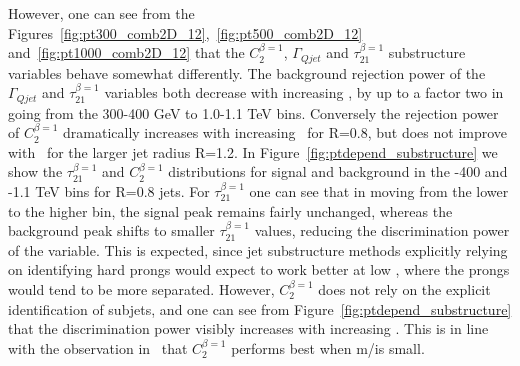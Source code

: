 However, one can see from the Figures~\ref{fig:pt300_comb2D_12},~\ref{fig:pt500_comb2D_12}
and~\ref{fig:pt1000_comb2D_12} that the $C_2^{\beta=1}$, $\Gamma_{Qjet}$ and
$\tau_{21}^{\beta=1}$ substructure variables behave somewhat
differently. The background rejection power of the $\Gamma_{Qjet}$ and
$\tau_{21}^{\beta=1}$ variables both decrease with increasing \pt, by
up to a factor two in going from the 300-400 GeV to
1.0-1.1 TeV bins. Conversely the rejection power of $C_2^{\beta=1}$
dramatically increases with increasing \pt~for R=0.8, but does not
improve with \pt~for the larger jet radius R=1.2. In Figure~\ref{fig:ptdepend_substructure} we show the
$\tau_{21}^{\beta=1}$ and $C_2^{\beta=1}$ distributions for signal and background in the -400 and -1.1 TeV bins for R=0.8 jets. For
$\tau_{21}^{\beta=1}$ one can see that in moving from the lower to the
higher \pt bin, the signal peak remains fairly unchanged, whereas the
background peak shifts to smaller $\tau_{21}^{\beta=1}$ values,
reducing the discrimination power of the variable. This is expected,
since jet substructure methods explicitly relying on identifying hard
prongs would expect to work better at low \pt, where the prongs would
tend to be more separated. However, $C_2^{\beta=1}$ does not rely on
the explicit identification of subjets, and one can see from
Figure~\ref{fig:ptdepend_substructure} that the discrimination power
visibly increases with increasing \pt. This is in line with the
observation in~\cite{Larkoski:2013eya} that $C_2^{\beta=1}$ performs best when m/\pt is small.

